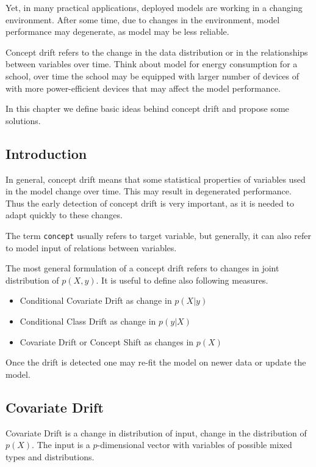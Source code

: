 \documentclass[]{krantz}
\providecommand{\tightlist}{%
  \setlength{\itemsep}{0pt}\setlength{\parskip}{0pt}}
\theoremstyle{definition}
\theoremstyle{definition}
\theoremstyle{definition}
\theoremstyle{remark}
\begin{document}
Yet, in many practical applications, deployed models are working in a
changing environment. After some time, due to changes in the
environment, model performance may degenerate, as model may be less
reliable.

Concept drift refers to the change in the data distribution or in the
relationships between variables over time. Think about model for energy
consumption for a school, over time the school may be equipped with
larger number of devices of with more power-efficient devices that may
affect the model performance.

In this chapter we define basic ideas behind concept drift and propose
some solutions.

\hypertarget{introduction-3}{%
\subsection{Introduction}\label{introduction-3}}

In general, concept drift means that some statistical properties of
variables used in the model change over time. This may result in
degenerated performance. Thus the early detection of concept drift is
very important, as it is needed to adapt quickly to these changes.

The term \texttt{concept} usually refers to target variable, but
generally, it can also refer to model input of relations between
variables.

The most general formulation of a concept drift refers to changes in
joint distribution of \(p(X, y)\). It is useful to define also following
measures.

\begin{itemize}
\tightlist
\item
  Conditional Covariate Drift as change in \(p(X | y)\)
\item
  Conditional Class Drift as change in \(p(y | X)\)
\item
  Covariate Drift or Concept Shift as changes in \(p(X)\)
\end{itemize}

Once the drift is detected one may re-fit the model on newer data or
update the model.

\hypertarget{covariate-drift}{%
\subsection{Covariate Drift}\label{covariate-drift}}

Covariate Drift is a change in distribution of input, change in the
distribution of \(p(X)\). The input is a \(p\)-dimensional vector with
variables of possible mixed types and distributions.
\end{document}
